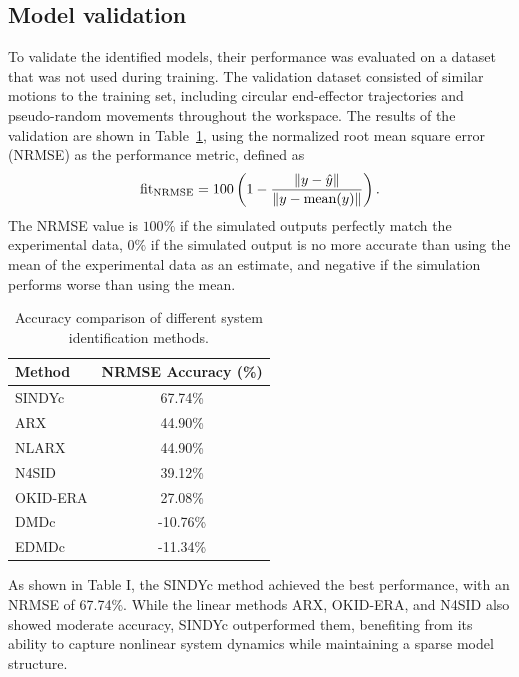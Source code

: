 \documentclass[../main.tex]{subfiles}
\begin{document}
\subsection{Model validation}
To validate the identified models, their performance was evaluated on a dataset that was not used during training. The validation dataset consisted of similar motions to the training set, including circular end-effector trajectories and pseudo-random movements throughout the workspace. The results of the validation are shown in Table~\ref{tab:sysID_accuracy}, using the normalized root mean square error (NRMSE) as the performance metric, defined as
\begin{equation}
    \text{fit}_{\rm NRMSE} = 100 \left(1 - \frac{\left\lVert y - \hat{y}\right\rVert}{\left\lVert y - \text{mean}(y)\right\rVert} \right).
\end{equation}
The NRMSE value is $100\%$ if the simulated outputs perfectly match the experimental data, $0\%$ if the simulated output is no more accurate than using the mean of the experimental data as an estimate, and negative if the simulation performs worse than using the mean.


\begin{table}[h]
    \centering
    \renewcommand{\arraystretch}{1.2} %
    \setlength{\tabcolsep}{10pt} %
    \begin{tabular}{lc}
        \toprule
        \textbf{Method} & \textbf{NRMSE Accuracy (\%)} \\
        \midrule
        SINDYc        & 67.74\% \\
        ARX           & 44.90\% \\
        NLARX         & 44.90\% \\
        N4SID         & 39.12\% \\
        OKID-ERA      & 27.08\% \\
        DMDc          & -10.76\%\\
        EDMDc         & -11.34\% \\
        \bottomrule
    \end{tabular}
    \vspace{2pt}
    \caption{Accuracy comparison of different system identification methods.}
    \vspace{-10pt}
    \label{tab:sysID_accuracy}
    \vspace{-4mm}
\end{table}
As shown in Table I, the SINDYc method achieved the best performance, with an NRMSE of 67.74\%. While the linear methods ARX, OKID-ERA, and N4SID also showed moderate accuracy, SINDYc outperformed them, benefiting from its ability to capture nonlinear system dynamics while maintaining a sparse model structure.
\end{document}
